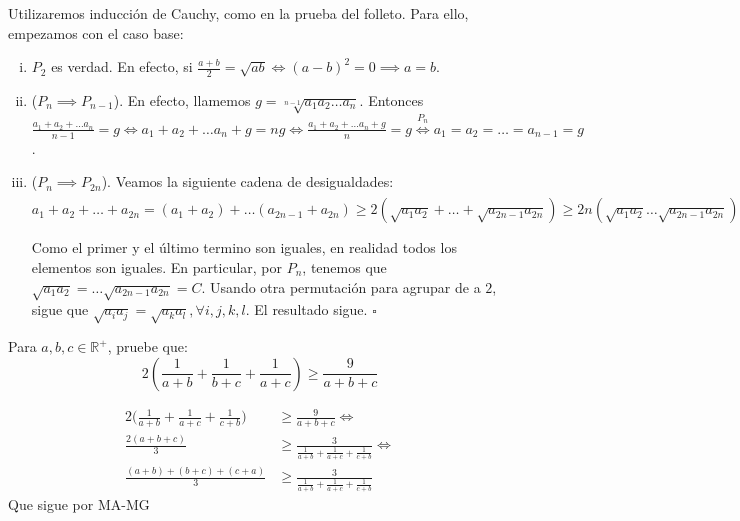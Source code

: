 \begin{sol}
	Utilizaremos inducci\'on de Cauchy, como en la prueba del folleto. Para ello, empezamos con el caso base:
	
	\begin{enumerate}[i.]
		\item $P_{2}$ es verdad. En efecto, si $\frac{a+b}{2} = \sqrt{ab} \iff (a-b)^{2} = 0 \implies a = b$. 
		\item ($P_{n} \implies P_{n-1}$). En efecto, llamemos $g = \sqrt[n-1]{a_{1}a_{2}\dots a_{n}}$. Entonces $\frac{a_{1}+a_{2} + \dots a_{n}}{n-1} = g \iff a_{1}+a_{2} + \dots a_{n} + g = ng \iff \frac{a_{1}+a_{2} + \dots a_{n} + g}{n} = g \overset{P_{n}}{\iff} a_{1} = a_{2} = \dots = a_{n-1} = g$. 
		\item ($P_{n} \implies P_{2n}$). Veamos la siguiente cadena de desigualdades: \\
		$a_{1} + a_{2} + \dots + a_{2n} = (a_{1} + a_{2}) + \dots (a_{2n-1} + a_{2n}) \geq  2(\sqrt{a_{1}a_{2}} + \dots + \sqrt{a_{2n-1}  a_{2n}}) \geq 2n(\sqrt{a_{1}a_{2}} \dots \sqrt{a_{2n-1}a_{2n}})^{\frac{1}{n}} \geq 2n \sqrt[2n]{a_{1}a_{2} \dots a_{2n}}$
		
		Como el primer y el \'ultimo termino son iguales, en realidad todos los elementos son iguales. En particular, por $P_{n}$, tenemos que $\sqrt{a_{1}a_{2}} = \dots \sqrt{a_{2n-1}a_{2n}} = C$. Usando otra permutaci\'on para agrupar de a $2$, sigue que $\sqrt{a_{i}a_{j}} = \sqrt{a_{k}a_{l}}, \forall i, j, k, l$. El resultado sigue. \flushright$\square$
	\end{enumerate}
\end{sol}

\begin{ejer}
	Para $a, b, c \in \mathbb{R}^{+}$, pruebe que:
	\begin{equation}
	2\left(\frac{1}{a+b} + \frac{1}{b+c} + \frac{1}{a+c}\right) \geq \frac{9}{a+b+c}
	\end{equation}
\end{ejer}

\begin{sol}
	\begin{align}
	2\bigg(\frac{1}{a+b}+\frac{1}{a+c}+\frac{1}{c+b}\bigg) &\geq \frac{9}{a+b+c} \iff \\
	\frac{2(a+b+c)}{3} &\geq \frac{3}{\frac{1}{a+b}+\frac{1}{a+c}+\frac{1}{c+b}} \iff \\
	\frac{(a+b)+(b+c)+(c+a)}{3} &\geq \frac{3}{\frac{1}{a+b}+\frac{1}{a+c}+\frac{1}{c+b}}
	\end{align}
	Que sigue por MA-MG
\end{sol}

